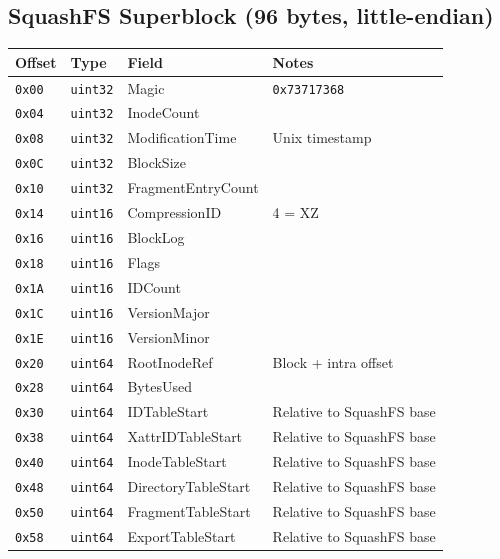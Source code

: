 \documentclass[11pt,a4paper]{article}
\begin{document}
\subsection{SquashFS Superblock (96 bytes, little-endian)}

\begin{center}
\begin{tabular}{llll}
\toprule
\textbf{Offset} & \textbf{Type} & \textbf{Field} & \textbf{Notes} \\
\midrule
\texttt{0x00} & \texttt{uint32} & Magic               & \texttt{0x73717368} \\
\texttt{0x04} & \texttt{uint32} & InodeCount          & \\
\texttt{0x08} & \texttt{uint32} & ModificationTime    & Unix timestamp \\
\texttt{0x0C} & \texttt{uint32} & BlockSize           & \\
\texttt{0x10} & \texttt{uint32} & FragmentEntryCount  & \\
\texttt{0x14} & \texttt{uint16} & CompressionID       & 4 = XZ \\
\texttt{0x16} & \texttt{uint16} & BlockLog            & \\
\texttt{0x18} & \texttt{uint16} & Flags               & \\
\texttt{0x1A} & \texttt{uint16} & IDCount             & \\
\texttt{0x1C} & \texttt{uint16} & VersionMajor        & \\
\texttt{0x1E} & \texttt{uint16} & VersionMinor        & \\
\texttt{0x20} & \texttt{uint64} & RootInodeRef        & Block + intra offset \\
\texttt{0x28} & \texttt{uint64} & BytesUsed           & \\
\texttt{0x30} & \texttt{uint64} & IDTableStart        & Relative to SquashFS base \\
\texttt{0x38} & \texttt{uint64} & XattrIDTableStart   & Relative to SquashFS base \\
\texttt{0x40} & \texttt{uint64} & InodeTableStart     & Relative to SquashFS base \\
\texttt{0x48} & \texttt{uint64} & DirectoryTableStart & Relative to SquashFS base \\
\texttt{0x50} & \texttt{uint64} & FragmentTableStart  & Relative to SquashFS base \\
\texttt{0x58} & \texttt{uint64} & ExportTableStart    & Relative to SquashFS base \\
\bottomrule
\end{tabular}
\end{center}
\end{document}
